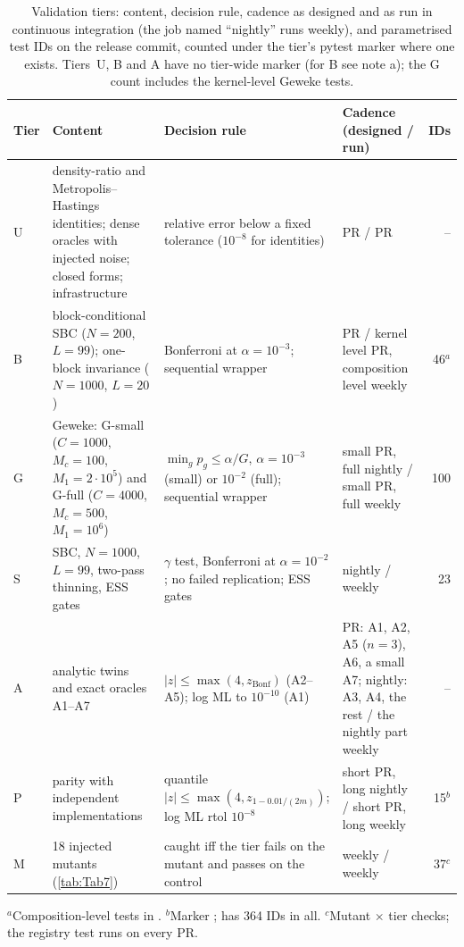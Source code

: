\begin{table}[!htbp]
  \centering
  \caption{Validation tiers: content, decision rule, cadence as designed and as run in
    continuous integration (the job named ``nightly'' runs weekly), and parametrised test IDs
    on the release commit, counted under the tier's pytest marker where one exists. Tiers~U, B and A
    have no tier-wide marker (for B see note a); the G count includes the kernel-level Geweke
    tests.}
  \label{tab:Tab5}
  \footnotesize
  \begin{tabular}{@{}l p{} p{} p{} r@{}}
    \toprule
    Tier & Content & Decision rule & Cadence (designed / run) & IDs \\
    \midrule
    U & density-ratio and Metropolis--Hastings identities; dense oracles with injected noise;
        closed forms; infrastructure
      & relative error below a fixed tolerance ($10^{-8}$ for identities)
      & PR / PR & -- \\
    B & block-conditional SBC ($N = 200$, $L = 99$); one-block invariance ($N = 1000$, $L = 20$)
      & Bonferroni at $\alpha = 10^{-3}$; sequential wrapper
      & PR / kernel level PR, composition level weekly & 46$^{a}$ \\
    G & Geweke: G-small ($C = 1000$, $M_c = 100$, $M_1 = 2\cdot10^5$) and G-full ($C = 4000$,
        $M_c = 500$, $M_1 = 10^6$)
      & $\min_g p_g \le \alpha/G$, $\alpha = 10^{-3}$ (small) or $10^{-2}$ (full); sequential
        wrapper
      & small PR, full nightly / small PR, full weekly & 100 \\
    S & SBC, $N = 1000$, $L = 99$, two-pass thinning, ESS gates
      & $\gamma$ test, Bonferroni at $\alpha = 10^{-2}$; no failed replication; ESS gates
      & nightly / weekly & 23 \\
    A & analytic twins and exact oracles A1--A7
      & $|z| \le \max(4, z_{\mathrm{Bonf}})$ (A2--A5); log ML to $10^{-10}$ (A1)
      & PR: A1, A2, A5 ($n = 3$), A6, a small A7; nightly: A3, A4, the rest / the
        nightly part weekly & -- \\
    P & parity with independent implementations
      & quantile $|z| \le \max(4, z_{1-0.01/(2m)})$; log ML rtol $10^{-8}$
      & short PR, long nightly / short PR, long weekly & 15$^{b}$ \\
    M & 18 injected mutants (\cref{tab:Tab7})
      & caught iff the tier fails on the mutant and passes on the control
      & weekly / weekly & 37$^{c}$ \\
    \bottomrule
  \end{tabular}

  \smallskip
  \raggedright
  $^{a}$Composition-level tests in .
  $^{b}$Marker ;  has 364 IDs in all.
  $^{c}$Mutant $\times$ tier checks; the registry test runs on every PR.
\end{table}

